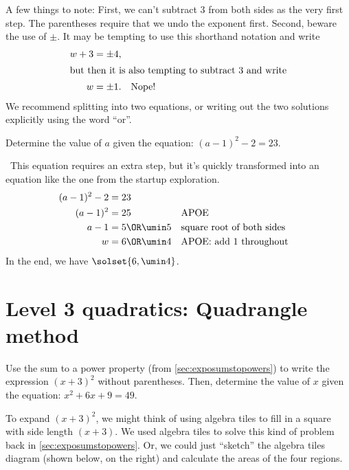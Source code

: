 A few things to note: First, we can't subtract 3 from both sides as the very first step. The parentheses require that we undo the exponent first. Second, beware the use of $\pm$. It may be tempting to use this shorthand notation and write
\begin{align*}
w+3 &= \pm4,\\
\intertext{but then it is also tempting to subtract 3 and write}
w &= \pm1. \quad\text{Nope!}
\end{align*}
We recommend splitting into two equations, or writing out the two solutions explicitly using the word ``or''.

\begin{boxedex}
Determine the value of $a$ given the equation: $(a-1)^2 - 2 = 23$.

\exsoln\ This equation requires an extra step, but it's quickly transformed into an equation like the one from the startup exploration.
\begin{align*}
(a-1)^2 - 2 &= 23
\\
(a-1)^2 &= 25
&&\text{APOE}
\\
a-1 &= 5 \OR \umin5
&&\text{square root of both sides}
\\
w &= 6 \OR \umin4
&&\text{APOE: add 1 throughout}
\end{align*}
In the end, we have $\solset{6, \umin4}$.
\end{boxedex}

\section{Level 3 quadratics: Quadrangle method}

\begin{boxedexplore}
Use the sum to a power property (from \cref{sec:exposumstopowers}) to write the expression $(x+3)^2$ without parentheses. Then, determine the value of $x$ given the equation: $x^2+6x+9 = 49$.
\end{boxedexplore} %

To expand $(x+3)^2$, we might think of using algebra tiles to fill in a square with side length $(x+3)$. We used algebra tiles to solve this kind of problem back in \cref{sec:exposumstopowers}. Or, we could just ``sketch'' the algebra tiles diagram (shown below, on the right) and calculate the areas of the four regions.

